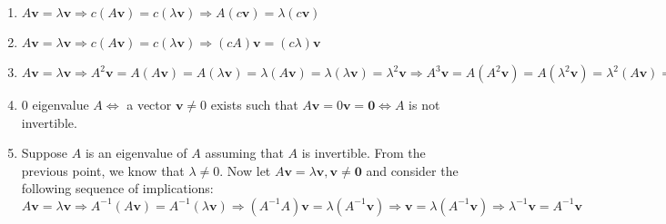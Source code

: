 \begin{enumerate}
    \item $A\mathbf{v} = \lambda\mathbf{v} \Rightarrow c(A\mathbf{v}) = c(\lambda\mathbf{v}) \Rightarrow A(c\mathbf{v}) = \lambda(c\mathbf{v})$

    \item $A\mathbf{v} = \lambda\mathbf{v} \Rightarrow c(A\mathbf{v}) = c(\lambda\mathbf{v}) \Rightarrow (cA)\mathbf{v} = (c\lambda)\mathbf{v}$

    \item $A\mathbf{v} = \lambda\mathbf{v} \Rightarrow A^2\mathbf{v} = A(A\mathbf{v}) = A(\lambda\mathbf{v}) = \lambda(A\mathbf{v}) = \lambda(\lambda\mathbf{v}) = \lambda^2\mathbf{v} \Rightarrow A^3\mathbf{v} = A(A^2\mathbf{v}) = A(\lambda^2\mathbf{v}) = \lambda^2(A\mathbf{v}) = \lambda^2(\lambda\mathbf{v}) = \lambda^3\mathbf{v}$

    \item $0$ eigenvalue $A \iff$ a vector $\mathbf{v} \neq 0$ exists such that $A\mathbf{v} = 0\mathbf{v} = \mathbf{0} \iff A$ is not invertible.

    \item Suppose $A$ is an eigenvalue of $A$ assuming that $A$ is invertible. From the previous point, we know that $\lambda \neq 0$. Now let $A\mathbf{v} = \lambda \mathbf{v}, \mathbf{v} \neq \mathbf{0}$ and consider the following sequence of implications: $A\mathbf{v} = \lambda\mathbf{v} \Rightarrow A^{-1}(A\mathbf{v}) = A^{-1}(\lambda\mathbf{v}) \Rightarrow (A^{-1}A)\mathbf{v} = \lambda(A^{-1}\mathbf{v}) \Rightarrow \mathbf{v} = \lambda(A^{-1}\mathbf{v}) \Rightarrow \lambda^{-1}\mathbf{v} = A^{-1}\mathbf{v}$
\end{enumerate}



